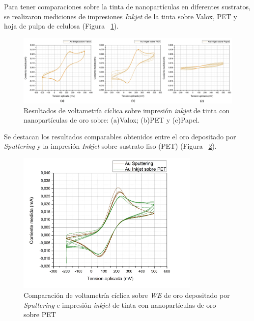 Para tener comparaciones sobre la tinta de nanopartículas en diferentes sustratos, se realizaron mediciones de impresiones \textit{Inkjet} de la tinta sobre Valox, PET y hoja de pulpa de celulosa (Figura ~\ref{fig:Figura_EQ_Inkjet_Valox_PET_Papel}).

\begin{figure}[H]
  \centering
    \includegraphics[width=1\textwidth]{Figuras/Figura_EQ_Inkjet_Valox_PET_Papel}
  \caption{Resultados de voltametría cíclica sobre impresión \textit{inkjet} de tinta con nanopartículas de oro sobre: (a)Valox; (b)PET y (c)Papel.}
  \label{fig:Figura_EQ_Inkjet_Valox_PET_Papel}
\end{figure}

Se destacan los resultados comparables obtenidos entre el oro depositado por \textit{Sputtering} y la impresión \textit{Inkjet} sobre sustrato liso (PET) (Figura ~\ref{fig:Figura_EQ_Sputt_Inkjet_PET}).

\begin{figure}[H]
  \centering
    \includegraphics[width=0.8\textwidth]{Figuras/Figura_EQ_Sputt_Inkjet_PET}
  \caption{Comparación de voltametría cíclica sobre \emph{WE} de oro depositado por \textit{Sputtering} e impresión \textit{inkjet} de tinta con nanopartículas de oro sobre PET}
  \label{fig:Figura_EQ_Sputt_Inkjet_PET}
\end{figure}
